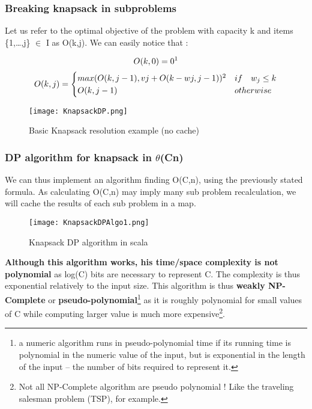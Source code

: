 \subsubsection{Breaking knapsack in subproblems}

Let us refer to the optimal objective of the problem with capacity k and
items \{1,…,j\} $\in$ I as O(k,j). We can easily notice that :

\[ O(k,0) = 0 \text{\footnotemark}\]
\[ O(k,j) = \begin{cases} 
      max(O(k,j-1) , vj +O(k-wj,j-1))\text{\footnotemark} & if \quad w_j \leq k \\
      O(k,j-1) & otherwise
   \end{cases}
\]

\begin{figure}[!ht]
    \centering
    \texttt{[image: KnapsackDP.png]}
    \caption{Basic Knapsack resolution example (no cache)}
    \label{fig:Knapsack_example}
\end{figure}
\FloatBarrier

\subsubsection{DP algorithm for knapsack in $\theta$(Cn)}

We can thus implement an algorithm finding O(C,n), using the previously 
stated formula. As calculating O(C,n) may imply many sub problem recalculation,
we will cache the results of each sub problem in a map.

\begin{figure}[!ht]
    \centering
    \texttt{[image: KnapsackDPAlgo1.png]}
    \caption{Knapsack DP algorithm in scala}
    \label{fig:Knapsack_example}
\end{figure}
\FloatBarrier

\textbf{Although this algorithm works, his time/space complexity is not polynomial} 
as log(C) bits are necessary to represent C. The complexity is thus exponential
relatively to the input size. This algorithm is thus \textbf{weakly NP-Complete} or 
\textbf{pseudo-polynomial}\footnote{a numeric algorithm runs in pseudo-polynomial time if its running time is polynomial in the numeric value of the input, but is exponential in the length of the input – the number of bits required to represent it.} as it is roughly polynomial for small values of C while computing larger value is much more expensive\footnote{Not all NP-Complete algorithm are pseudo polynomial ! Like the 
traveling salesman problem (TSP), for example.}.

